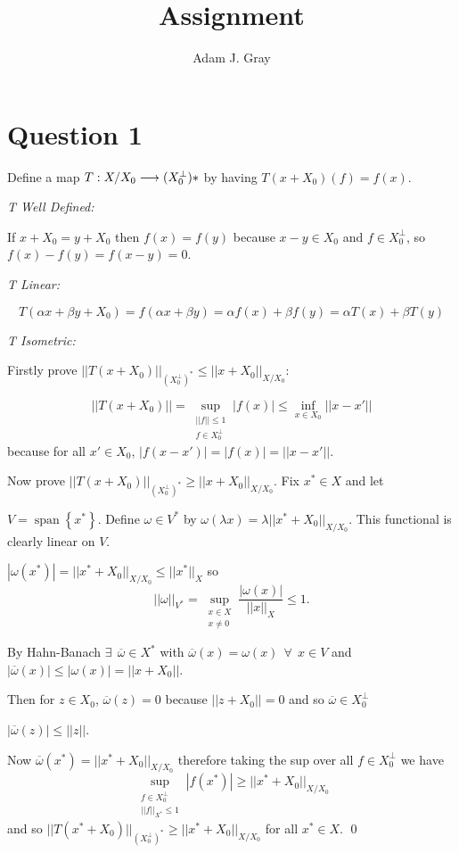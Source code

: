 \documentclass{unswmaths}
\begin{document}
\author{Adam J. Gray}
\title{Assignment}
\subject{Functional Analysis}

\unswtitle
\unswantiplagdec

\section*{Question 1}
Define a map $ T : X/X_0 \longrightarrow (X_0^\perp)* $ by having $ T(x + X_0 )(f) = f(x) $.

\emph{T Well Defined:}

If $ x + X_0 = y + X_0 $ then $ f(x) = f(y) $ because $ x - y \in X_0 $ and $ f \in X_0^\perp $, so $ f(x) - f(y) = f(x-y) = 0 $.

\emph{T Linear:}

$$ T(\alpha x + \beta y + X_0) = f(\alpha x + \beta y) = \alpha f( x) + \beta f( y) = \alpha T(x) + \beta T(y) $$

\emph{T Isometric:}

Firstly prove $ ||T(x + X_0)||_{(X_0^\perp)^*} \leq ||x + X_0||_{X/X_0} $:

$$ ||T(x + X_0) || = \sup_{\substack{||f|| \leq 1 \\ f \in X^\perp_0}}|f(x)| \leq \inf_{x \in X_0} ||x-x'|| $$
because for all $ x' \in X_0 $, $ |f(x-x')| = |f(x)| = ||x-x'|| $.

Now prove $ ||T(x + X_0)||_{(X_0^\perp)^*} \geq ||x + X_0||_{X/X_0} $.
Fix $ x^* \in X $ and let 

$ V = \operatorname{span}\left\{x^* \right\}$. Define $ \omega \in V^* $ by $ \omega(\lambda x) = \lambda||x^* + X_0||_{X/X_0}$. This functional is clearly linear on $ V $. 

$ |\omega(x^*) | = ||x^*+X_0||_{X/X_0} \leq ||x^*||_{X} $ so  $$ ||\omega||_{V^*} = \sup_{\substack{x \in X \\ x \neq 0}} \frac{|\omega(x)|}{||x||_X} \leq 1. $$

By Hahn-Banach $ \exists \ \ \overline{\omega} \in X^* $ with $ \overline{\omega}(x) = \omega(x) \ \ \forall \ \ x \in V $
and $ |\overline{\omega}(x)| \leq |\omega(x)| = || x + X_0 || $.

Then for $ z \in X_0 $, $ \overline{\omega}(z) = 0 $ because $ || z + X_0 || = 0 $ and so $ \overline{\omega} \in X_0^\perp $ 

$ |\overline{\omega}(z)| \leq ||z|| $.

Now $ \overline{\omega}(x^*) = ||x^* + X_0||_{X/X_0} $ therefore taking the sup over all $ f \in X_0^\perp $ we have
$$
	\sup_{\substack{f \in X_0^\perp \\ ||f||_{X^*} \leq 1}} |f(x^*)| \geq ||x^* + X_0 ||_{X/X_0}
$$
and so $ ||T(x^* + X_0)||_{(X_0^\perp)^*} \geq ||x^* + X_0||_{X/X_0} $ for all $ x^* \in X $.
\qed
\end{document}
